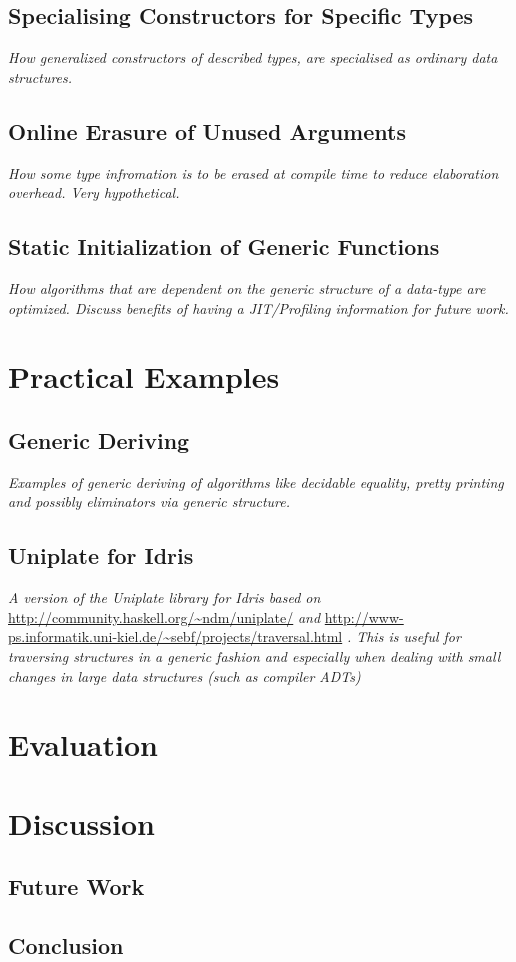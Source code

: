 \documentclass{ituthesis}
\begin{document}
\section{Specialising Constructors for Specific Types}
\label{sec:SpecialisingConstructorsforSpecificTypes}
\textit{How generalized constructors of described types, are specialised as ordinary data structures.}
\section{Online Erasure of Unused Arguments}
\textit{How some type infromation is to be erased at compile time to reduce elaboration overhead. Very hypothetical.}
\label{sec:OnlineErasureofUnusedArguments}
\section{Static Initialization of Generic Functions}
\label{sec:StaticInitializationofGenericFunctions}
\textit{How algorithms that are dependent on the generic structure of a data-type are optimized. Discuss benefits of having a JIT/Profiling information for future work.}
\chapter{Practical Examples}
\label{cha:PracticalExamples}
\section{Generic Deriving}
\label{sec:GenericDeriving}
\textit{Examples of generic deriving of algorithms like decidable equality, pretty printing and possibly eliminators via generic structure.}
\section{Uniplate for Idris}
\label{sec:UniplateforIdris}
\textit{A version of the Uniplate library for Idris based on} \url{http://community.haskell.org/~ndm/uniplate/} \textit{and} \url{http://www-ps.informatik.uni-kiel.de/~sebf/projects/traversal.html} \textit{.
This is useful for traversing structures in a generic fashion and especially when dealing with small changes in large data structures (such as compiler ADTs)}
\chapter{Evaluation}
\label{cha:Evaluation}
\chapter{Discussion}
\label{cha:Discussion}
\section{Future Work}
\label{sec:FutureWork}
\section{Conclusion}
\label{sec:Conclusion}
\end{document}
